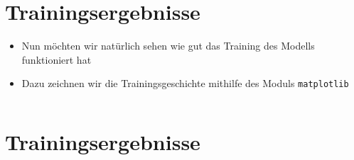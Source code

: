 \documentclass[t]{beamer}
\newcommand\pycode[1]{\inputminted[frame=lines, framesep=2mm, fontsize=\normalsize]{python}{#1}}
\begin{document}
\section{Trainingsergebnisse}
\begin{frame}
    \begin{itemize}
        \item Nun möchten wir natürlich sehen wie gut das Training des Modells funktioniert hat
        \item Dazu zeichnen wir die Trainingsgeschichte mithilfe des Moduls \texttt{matplotlib}
        \pycode{./code-snippets/plot-results.py}
    \end{itemize}
\end{frame}

\section{Trainingsergebnisse}
\end{document}
